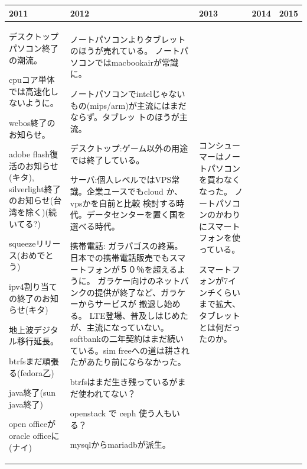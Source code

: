 \documentclass[mingoth,a4paper]{jsarticle}
\begin{document}
{%
\footnotesize
\begin{tabular}[t]{|p{8em}|p{12em}|p{12em}|p{8em}|p{9em}|}
\hline
2011 &2012 & 2013 & 2014 & 2015 \\
\hline

 デスクトップパソコン終了の潮流。

 cpuコア単体では高速化しないように。

 webos終了のお知らせ。

 adobe flash復活のお知らせ(キタ), silverlight終了のお知らせ(台湾を除く)(続いてる?)

 squeezeリリース(おめでとう)

 ipv4割り当ての終了のお知らせ(キタ)

 地上波デジタル移行延長。

 btrfsまだ頑張る(fedora乙)

 java終了(sun java終了)

 open officeがoracle officeに(ナイ)

 &

 ノートパソコンよりタブレットのほうが売れている。
 ノートパソコンではmacbookairが常識に。

 ノートパソコンでintelじゃないもの(mips/arm)が主流にはまだならず。タブレッ
 トのほうが主流。

 デスクトップ:ゲーム以外の用途では終了している。

 サーバ:個人レベルではVPS常識。企業ユースでもcloud か、vpsかを自前と比較
     検討する時代。データセンターを置く国を選べる時代。

 携帯電話:
 ガラパゴスの終焉。日本での携帯電話販売でもスマートフォンが５０％を超えるように。
     ガラケー向けのネットバンクの提供が終了など、ガラケーからサービスが
     撤退し始める。
 LTE登場、普及しはじめたが、主流になっていない。
 softbankの二年契約はまだ続いている。sim freeへの道は耕されたがあたり前にならなかった。

 btrfsはまだ生き残っているがまだ使われてない？

     openstack で ceph 使う人もいる？

 mysqlからmariadbが派生。

 & 

コンシューマーはノートパソコンを買わなくなった。
ノートパソコンのかわりにスマートフォンを使っている。

スマートフォンが7インチくらいまで拡大、タブレットとは何だったのか。


\end{tabular}}
\end{document}
